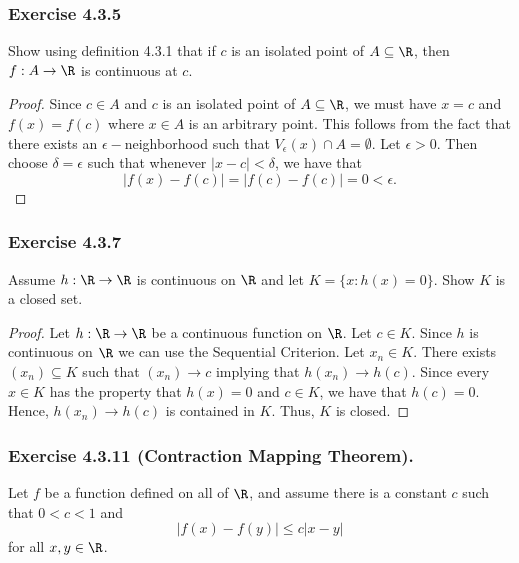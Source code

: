 \subsubsection{Exercise 4.3.5} Show using definition 4.3.1 that if \( c \) is an isolated point of \( A \subseteq \R  \), then \( f: A \to \R  \) is continuous at \( c \).
\begin{proof}
    Since \( c \in A  \) and \( c  \) is an isolated point of \( A \subseteq \R  \), we must have \( x = c  \) and \( f(x) = f(c) \) where \( x \in A  \) is an arbitrary point. This follows from the fact that there exists an \( \epsilon - \)neighborhood such that \( V_{\epsilon }(x) \cap A = \emptyset \). Let \( \epsilon > 0  \). Then choose \( \delta = \epsilon  \) such that whenever \( | x - c  | < \delta \), we have that 
\[ | f(x) - f(c) | = | f(c) - f(c) | = 0 < \epsilon. \]
\end{proof}




\subsubsection{Exercise 4.3.7} Assume \( h: \R \to \R  \) is continuous on \( \R  \) and let \( K = \{ x : h(x) = 0  \}  \). Show \( K \) is a closed set.
\begin{proof}
Let \( h: \R \to \R  \) be a continuous function on \( \R  \).  Let \( c \in K  \). Since \( h \) is continuous on \( \R  \) we can use the Sequential Criterion. Let \( x_n \in K  \). There exists  \( (x_n) \subseteq K\) such that \( (x_n) \to  c \) implying that \( h(x_n) \to h(c) \). Since every \( x \in K  \) has the property that \( h(x) = 0  \) and \( c \in K  \), we have that \( h(c) = 0  \). Hence, \( h(x_n) \to h(c) \) is contained in \( K \). Thus, \( K \) is closed. 
\end{proof}






\subsubsection{Exercise 4.3.11 (Contraction Mapping Theorem).} Let \( f  \) be a function defined on all of \( \R  \), and assume there is a constant \( c  \) such that \(  0 < c < 1 \) and 
\[  | f(x) - f(y) | \leq c | x - y |  \]
for all \( x,y \in \R  \).

